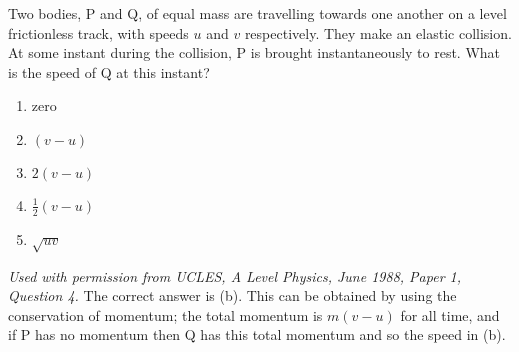 
\begin{problem}[A1988PIQ4l]
{Two bodies, P and Q, of equal mass are travelling towards one another on a level frictionless track, with speeds $u$ and $v$ respectively. They make an elastic collision. At some instant during the collision, P is brought instantaneously to rest. What is the speed of Q at this instant?
\begin{enumerate}
	\item zero
	\item $(v - u)$ \answer
	\item $2(v - u)$
	\item $\frac{1}{2}(v - u)$
	\item $\sqrt{uv}$
\end{enumerate}
}
{\textit{Used with permission from UCLES, A Level Physics, June 1988, Paper 1, Question 4.}}
{The correct answer is (b). This can be obtained by using the conservation of momentum; the total momentum is $m(v - u)$ for all time, and if P has no momentum then Q has this total momentum and so the speed in (b).}
\end{problem}